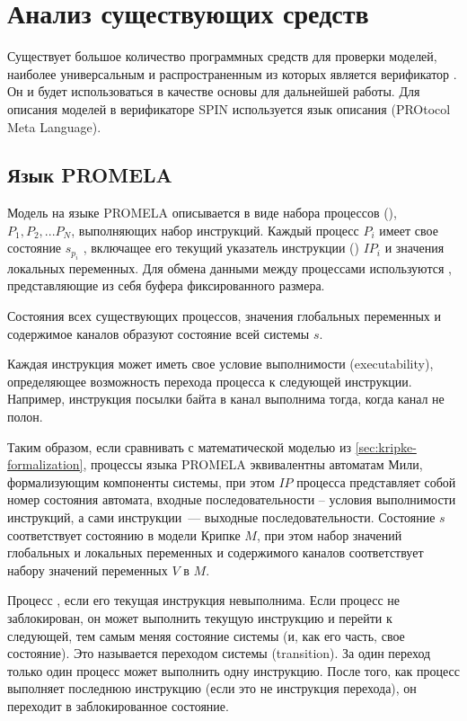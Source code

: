 \chapter{Анализ существующих средств}
\label{cha:analogues}

Существует большое количество программных средств для проверки моделей, наиболее
универсальным и распространенным из которых является верификатор 
\cite{SpinRoot}. Он и будет использоваться в качестве основы для дальнейшей работы. Для
описания моделей в верификаторе SPIN используется язык описания  (PROtocol
  Meta Language).

\section{Язык PROMELA}
\label{sec:promela}

Модель на языке PROMELA описывается в виде набора процессов (), $P_1, P_2,
... P_N$, выполняющих набор инструкций. Каждый процесс $P_i$ имеет свое состояние
$s_{p_i}$ , включащее его текущий указатель инструкции () $IP_i$
и значения локальных переменных. Для обмена данными между процессами используются
, представляющие из себя буфера фиксированного размера.

Состояния всех существующих процессов, значения глобальных переменных и содержимое каналов
образуют состояние всей системы $s$.

Каждая инструкция может иметь свое условие выполнимости (executability), определяющее
возможность перехода процесса к следующей инструкции. Например, инструкция посылки байта в
канал выполнима тогда, когда канал не полон.

Таким образом, если сравнивать с математической моделью из \ref{sec:kripke-formalization},
процессы языка PROMELA эквивалентны автоматам Мили, формализующим компоненты системы, при
этом $IP$ процесса представляет собой номер состояния автомата, входные последовательности
-- условия выполнимости инструкций, а сами инструкции~--- выходные
последовательности. Состояние $s$ соответствует состоянию в модели Крипке $M$, при этом набор
значений глобальных и локальных переменных и содержимого каналов соответствует набору
значений переменных $V$ в $M$.

Процесс , если его текущая инструкция невыполнима. Если процесс не
заблокирован, он может выполнить текущую инструкцию и перейти к следующей, тем самым меняя
состояние системы (и, как его часть, свое состояние). Это называется переходом системы
(transition). За один переход только один процесс может выполнить одну инструкцию. После
того, как процесс выполняет последнюю инструкцию (если это не инструкция перехода), он
переходит в заблокированное состояние.

